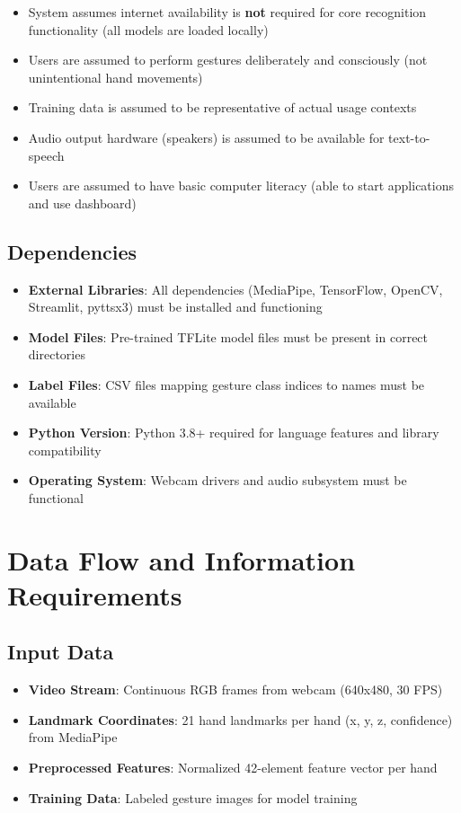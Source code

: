 \begin{itemize}
    \item System assumes internet availability is \textbf{not} required for core recognition functionality (all models are loaded locally)
    \item Users are assumed to perform gestures deliberately and consciously (not unintentional hand movements)
    \item Training data is assumed to be representative of actual usage contexts
    \item Audio output hardware (speakers) is assumed to be available for text-to-speech
    \item Users are assumed to have basic computer literacy (able to start applications and use dashboard)
\end{itemize}

\subsection{Dependencies}

\begin{itemize}
    \item \textbf{External Libraries}: All dependencies (MediaPipe, TensorFlow, OpenCV, Streamlit, pyttsx3) must be installed and functioning
    \item \textbf{Model Files}: Pre-trained TFLite model files must be present in correct directories
    \item \textbf{Label Files}: CSV files mapping gesture class indices to names must be available
    \item \textbf{Python Version}: Python 3.8+ required for language features and library compatibility
    \item \textbf{Operating System}: Webcam drivers and audio subsystem must be functional
\end{itemize}

\section{Data Flow and Information Requirements}

\subsection{Input Data}

\begin{itemize}
    \item \textbf{Video Stream}: Continuous RGB frames from webcam (640x480, 30 FPS)
    \item \textbf{Landmark Coordinates}: 21 hand landmarks per hand (x, y, z, confidence) from MediaPipe
    \item \textbf{Preprocessed Features}: Normalized 42-element feature vector per hand
    \item \textbf{Training Data}: Labeled gesture images for model training
\end{itemize}

